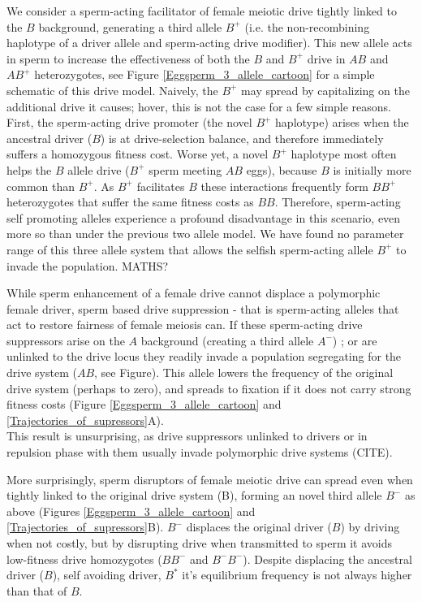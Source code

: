 \documentclass[12pt,letterpaper]{article}
\newcommand{\yb}[1]{{ \color{blue} #1}}
\begin{document}
We consider a sperm-acting facilitator of
	female meiotic drive tightly linked to the $B$ background, 
	generating a third allele $B^{+}$ (i.e. the non-recombining haplotype of a
        driver allele and sperm-acting drive modifier). 
This new allele acts in sperm to increase the effectiveness of both
	the $B$ and  $B^{+}$ drive in $AB$ and $AB^{+}$ heterozygotes, see Figure \ref{Eggsperm_3_allele_cartoon} 
	for a simple schematic of this drive model.  
Naively, the $B^{+}$ may spread by capitalizing on the additional drive it causes; hover,  
	this is not the case for a few simple reasons. 
First, the sperm-acting drive promoter (the novel $B^{+}$ haplotype) 
	arises when the ancestral driver ($B$) is at drive-selection balance, 
	and therefore immediately suffers a homozygous fitness cost.  
Worse yet, a novel $B^{+}$ haplotype most often helps 
	the $B$  allele drive ($B^+$ sperm meeting $AB$ eggs), because $B$ is initially more common than $B^{+}$. 
As $B^{+}$ facilitates $B$ these interactions frequently form 
	$BB^{+}$ heterozygotes that suffer the same fitness costs as $BB$. 
Therefore, sperm-acting self promoting alleles experience a profound disadvantage
	in this scenario, even more so than under the previous two allele model. 
We have found no parameter range of this
	three allele system that allows the selfish sperm-acting allele $B^{+}$ to
	invade the population. \yb{MATHS?}

While  sperm enhancement of a female drive cannot displace a polymorphic female driver, sperm based drive suppression - 
	that is sperm-acting alleles that act to restore 
	fairness of female meiosis can. 
If these sperm-acting drive suppressors arise on
	the $A$ background (creating a third allele $A^{-}$) ;
	or are unlinked to the drive locus they readily invade a population segregating
	for the drive system ($AB$, see Figure). 
This allele lowers the frequency of the original drive system (perhaps to zero),
	and spreads to fixation if it does not carry strong fitness costs
	(Figure \ref{Eggsperm_3_allele_cartoon} and \ref{Trajectories_of_supressors}A). \\
\yb{This result is unsurprising, as drive suppressors unlinked to drivers or in repulsion phase with them usually invade polymorphic drive systems (CITE).}  

More surprisingly, sperm disruptors of female meiotic drive can spread
	even when tightly linked to the original drive system (B), forming
	an novel third allele $B^{-}$ as above 
	(Figures \ref{Eggsperm_3_allele_cartoon} and \ref{Trajectories_of_supressors}B). 
$B^{-}$ displaces the original driver ($B$) by driving when not costly, 
	but by disrupting drive when transmitted to sperm it avoids low-fitness drive homozygotes ($BB^-$ and $B^-B^-$). 
Despite displacing the ancestral driver ($B$), self avoiding driver, $B^*$ it's equilibrium frequency is not always higher than that of $B$. 
\end{document}
